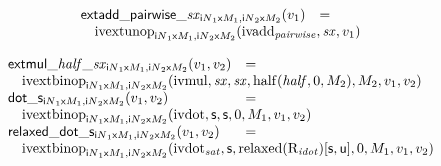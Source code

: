 $$
\begin{array}[t]{@{}lcl@{}l@{}}
{{\mathsf{extadd\_pairwise}}{\mathsf{\_}}{{\mathit{sx}}}}{{}_{{{{\mathsf{i}}{N}}_1}{\mathsf{x}}{M_1}, {{{\mathsf{i}}{N}}_2}{\mathsf{x}}{M_2}}(v_1)} & = & & \\
 \multicolumn{4}{@{}l@{}}{\quad
\begin{array}[t]{@{}l@{}}
{{\mathrm{ivextunop}}}_{{{{\mathsf{i}}{N}}_1}{\mathsf{x}}{M_1}, {{{\mathsf{i}}{N}}_2}{\mathsf{x}}{M_2}}({\mathrm{ivadd}}_{{\mathit{pairwise}}}, {\mathit{sx}}, v_1) \\
\end{array}
} \\
\end{array}
$$

$$
\begin{array}[t]{@{}lcl@{}l@{}}
{{\mathsf{extmul}}{\mathsf{\_}}{{\mathit{half}}}{\mathsf{\_}}{{\mathit{sx}}}}{{}_{{{{\mathsf{i}}{N}}_1}{\mathsf{x}}{M_1}, {{{\mathsf{i}}{N}}_2}{\mathsf{x}}{M_2}}(v_1, v_2)} & = & & \\
 \multicolumn{4}{@{}l@{}}{\quad
\begin{array}[t]{@{}l@{}}
{{\mathrm{ivextbinop}}}_{{{{\mathsf{i}}{N}}_1}{\mathsf{x}}{M_1}, {{{\mathsf{i}}{N}}_2}{\mathsf{x}}{M_2}}({\mathrm{ivmul}}, {\mathit{sx}}, {\mathit{sx}}, {\mathrm{half}}({\mathit{half}}, 0, M_2), M_2, v_1, v_2) \\
\end{array}
} \\
{{\mathsf{dot}}{\mathsf{\_}}{\mathsf{s}}}{{}_{{{{\mathsf{i}}{N}}_1}{\mathsf{x}}{M_1}, {{{\mathsf{i}}{N}}_2}{\mathsf{x}}{M_2}}(v_1, v_2)} & = & & \\
 \multicolumn{4}{@{}l@{}}{\quad
\begin{array}[t]{@{}l@{}}
{{\mathrm{ivextbinop}}}_{{{{\mathsf{i}}{N}}_1}{\mathsf{x}}{M_1}, {{{\mathsf{i}}{N}}_2}{\mathsf{x}}{M_2}}({\mathrm{ivdot}}, \mathsf{s}, \mathsf{s}, 0, M_1, v_1, v_2) \\
\end{array}
} \\
{{\mathsf{relaxed\_dot}}{\mathsf{\_}}{\mathsf{s}}}{{}_{{{{\mathsf{i}}{N}}_1}{\mathsf{x}}{M_1}, {{{\mathsf{i}}{N}}_2}{\mathsf{x}}{M_2}}(v_1, v_2)} & = & & \\
 \multicolumn{4}{@{}l@{}}{\quad
\begin{array}[t]{@{}l@{}}
{{\mathrm{ivextbinop}}}_{{{{\mathsf{i}}{N}}_1}{\mathsf{x}}{M_1}, {{{\mathsf{i}}{N}}_2}{\mathsf{x}}{M_2}}({\mathrm{ivdot}}_{{\mathit{sat}}}, \mathsf{s}, {{\mathrm{relaxed}}({\mathrm{R}}_{\mathit{idot}})}{{}[ \mathsf{s}, \mathsf{u} ]}, 0, M_1, v_1, v_2) \\
\end{array}
} \\
\end{array}
$$

